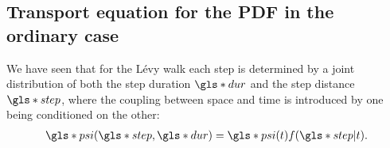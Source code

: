 




\subsection{Transport equation for the PDF in the ordinary case}

We have seen that for the L\'evy walk each step is determined by a joint distribution of both the step duration $\gls*{dur}$ and the step distance $\gls*{step}$, where the coupling between space and time is introduced by one being conditioned on the other:
%
\begin{align}
\gls*{psi}(\gls*{step}, \gls*{dur}) = \gls*{psi}(t) f(\gls*{step}|t) .
\end{align}

